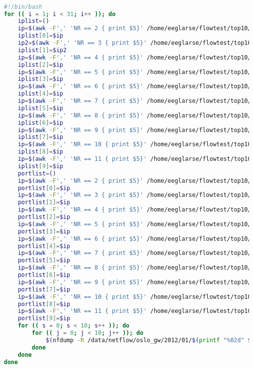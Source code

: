 \begin{lstlisting}[language=bash]

#!/bin/bash
for (( i = 1; i < 31; i++ )); do
	iplist=()
	ip=$(awk -F',' 'NR == 2 { print $5}' /home/eeglarse/flowtest/top10/$(printf "%02d" $i).csv)
	iplist[0]=$ip
	ip2=$(awk -F',' 'NR == 3 { print $5}' /home/eeglarse/flowtest/top10/$(printf "%02d" $i).csv)
	iplist[1]=$ip2
	ip=$(awk -F',' 'NR == 4 { print $5}' /home/eeglarse/flowtest/top10/$(printf "%02d" $i).csv)
	iplist[2]=$ip
	ip=$(awk -F',' 'NR == 5 { print $5}' /home/eeglarse/flowtest/top10/$(printf "%02d" $i).csv)
	iplist[3]=$ip
	ip=$(awk -F',' 'NR == 6 { print $5}' /home/eeglarse/flowtest/top10/$(printf "%02d" $i).csv)
	iplist[4]=$ip
	ip=$(awk -F',' 'NR == 7 { print $5}' /home/eeglarse/flowtest/top10/$(printf "%02d" $i).csv)
	iplist[5]=$ip
	ip=$(awk -F',' 'NR == 8 { print $5}' /home/eeglarse/flowtest/top10/$(printf "%02d" $i).csv)
	iplist[6]=$ip
	ip=$(awk -F',' 'NR == 9 { print $5}' /home/eeglarse/flowtest/top10/$(printf "%02d" $i).csv)
	iplist[7]=$ip
	ip=$(awk -F',' 'NR == 10 { print $5}' /home/eeglarse/flowtest/top10/$(printf "%02d" $i).csv)
	iplist[8]=$ip
	ip=$(awk -F',' 'NR == 11 { print $5}' /home/eeglarse/flowtest/top10/$(printf "%02d" $i).csv)
	iplist[9]=$ip
	portlist=()
	ip=$(awk -F',' 'NR == 2 { print $5}' /home/eeglarse/flowtest/top10/top10port/$(printf "%02d" $i).csv)
	portlist[0]=$ip
	ip=$(awk -F',' 'NR == 3 { print $5}' /home/eeglarse/flowtest/top10/top10port/$(printf "%02d" $i).csv)
	portlist[1]=$ip
	ip=$(awk -F',' 'NR == 4 { print $5}' /home/eeglarse/flowtest/top10/top10port/$(printf "%02d" $i).csv)
	portlist[2]=$ip
	ip=$(awk -F',' 'NR == 5 { print $5}' /home/eeglarse/flowtest/top10/top10port/$(printf "%02d" $i).csv)
	portlist[3]=$ip
	ip=$(awk -F',' 'NR == 6 { print $5}' /home/eeglarse/flowtest/top10/top10port/$(printf "%02d" $i).csv)
	portlist[4]=$ip
	ip=$(awk -F',' 'NR == 7 { print $5}' /home/eeglarse/flowtest/top10/top10port/$(printf "%02d" $i).csv)
	portlist[5]=$ip
	ip=$(awk -F',' 'NR == 8 { print $5}' /home/eeglarse/flowtest/top10/top10port/$(printf "%02d" $i).csv)
	portlist[6]=$ip
	ip=$(awk -F',' 'NR == 9 { print $5}' /home/eeglarse/flowtest/top10/top10port/$(printf "%02d" $i).csv)
	portlist[7]=$ip
	ip=$(awk -F',' 'NR == 10 { print $5}' /home/eeglarse/flowtest/top10/top10port/$(printf "%02d" $i).csv)
	portlist[8]=$ip
	ip=$(awk -F',' 'NR == 11 { print $5}' /home/eeglarse/flowtest/top10/top10port/$(printf "%02d" $i).csv)
	portlist[9]=$ip
	for (( s = 0; s < 10; s++ )); do
	   	for (( j = 0; j < 10; j++ )); do
	   		$(nfdump -R /data/netflow/oslo_gw/2012/01/$(printf "%02d" $i)/nfcapd.201201$(printf "%02d" $i)0000:nfcapd.201201$(printf "%02d" $i)2355 -n 10 -s dstport -o csv 'dst ip ${iplist[$s]} and dst port ${portlist[$j]}' -o csv)
	   	done
	done
done
\end{lstlisting}
